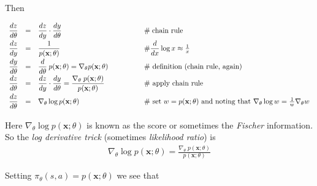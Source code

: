 \documentclass[11pt, oneside]{article}   	%
\begin{document}
\bigskip
\noindent
Then 

\begin{equation*}
\begin{array}{lllll}
\vspace{0.80mm}
\dfrac{dz}{d \theta} 
&=&                   \dfrac{dz}{dy} \cdot \dfrac{dy}{d\theta}                                               & \qquad \qquad \mathrel{\#}  \text{chain rule} \\
\vspace{0.80mm}
\dfrac{dz}{dy} 
&=&                     \dfrac{1}{p(\mathbf{x};\theta)}                                                        & \qquad \qquad \mathbin{\#} \dfrac{d}{dx} \log x \approx \frac{1}{x} \\
\vspace{0.80mm}
 \dfrac{dy}{d\theta} 
 &=& \dfrac{d}{d\theta}  \:p(\mathbf{x};\theta) = \nabla_\theta p(\mathbf{x};\theta)   & \qquad \qquad  \mathbin{\#} \text{ definition (chain rule, again)}\\
 \vspace{0.80mm}
 \dfrac{dz}{d \theta} 
 &=&          \dfrac{dz}{dy} \cdot \dfrac{dy}{d\theta} = \dfrac{\nabla_\theta \; p(\mathbf{x};\theta)}{p(\mathbf{x};\theta)} & \qquad \qquad  \mathbin{\#} \text{ apply chain rule} \\
 \vspace{0.80mm}
 \dfrac{dz}{d \theta} 
&=&  \nabla_\theta \log p(\mathbf{x};\theta)                                           & \qquad \qquad\mathbin{\#} \text{ set $w = p(\mathbf{x};\theta)$ and noting that } \nabla_{\theta} \log w = \frac{1}{w}\nabla_\theta w 
\end{array}
\end{equation*}

\bigskip
\noindent
Here $\nabla_\theta \log p(\mathbf{x};\theta)$ is known as the score or sometimes the \emph{Fischer} information. So the \emph{log derivative trick} (sometimes \emph{likelihood ratio}) is 
\begin{align*}
\nabla_\theta \log p(\mathbf{x};\theta)   = \frac{\nabla_\theta \; p(\mathbf{x};\theta)}{p(\mathbf{x};\theta)}
\end{align*}

\bigskip
\noindent
Setting  $\pi_\theta(s,a) = p(\mathbf{x};\theta)$ we see that
\end{document}
